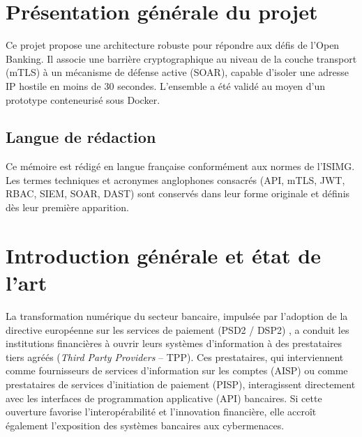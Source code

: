 \begin{abstract}
Ce mémoire présente la conception et la validation d'une architecture de sécurité \textit{Zero Trust}, conforme au NIST SP 800-207, pour les API bancaires ouvertes dans le contexte de l'Open Banking et de la directive PSD2. La solution intègre une passerelle NGINX utilisant mTLS, un serveur d'identité Keycloak reposant sur OAuth 2.0 et des jetons signés avec RS256, un backend FastAPI, un frontend Flask ainsi qu'une pile SIEM/SOAR réactive calculant un score dynamique de menace $T_{decay}(x, t)$. L'audit DAST réalisé avec OWASP ZAP n'a révélé aucune vulnérabilité critique dans le périmètre évalué.
\end{abstract}

\section*{Présentation générale du projet}
Ce projet propose une architecture robuste pour répondre aux défis de l'Open Banking. Il associe une barrière cryptographique au niveau de la couche transport (mTLS) à un mécanisme de défense active (SOAR), capable d'isoler une adresse IP hostile en moins de 30 secondes. L'ensemble a été validé au moyen d'un prototype conteneurisé sous Docker.

\subsection*{Langue de rédaction}
Ce mémoire est rédigé en langue française conformément aux normes de l'ISIMG. Les termes techniques et acronymes anglophones consacrés (API, mTLS, JWT, RBAC, SIEM, SOAR, DAST) sont conservés dans leur forme originale et définis dès leur première apparition.

\section{Introduction générale et état de l'art}

La transformation numérique du secteur bancaire, impulsée par l'adoption de la directive européenne sur les services de paiement (PSD2 / DSP2) \cite{psd2}, a conduit les institutions financières à ouvrir leurs systèmes d'information à des prestataires tiers agréés (\textit{Third Party Providers} -- TPP). Ces prestataires, qui interviennent comme fournisseurs de services d'information sur les comptes (AISP) ou comme prestataires de services d'initiation de paiement (PISP), interagissent directement avec les interfaces de programmation applicative (API) bancaires. Si cette ouverture favorise l'interopérabilité et l'innovation financière, elle accroît également l'exposition des systèmes bancaires aux cybermenaces.

